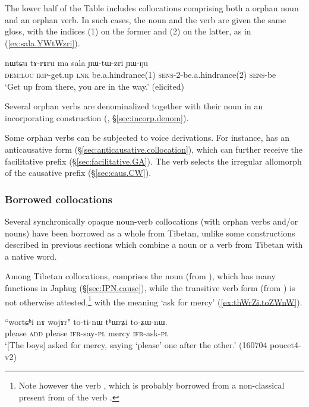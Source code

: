 The lower half of the Table includes collocations comprising both a orphan noun and an orphan verb. In such cases, the noun and the verb are given the same gloss, with the indices (1) on the former and (2) on the latter, as in (\ref{ex:sala.YWtWzri}). %

\begin{exe}
\ex \label{ex:sala.YWtWzri}
\gll nɯtɕu tɤ-rɤru ma sala ɲɯ-tɯ-zri ɲɯ-ŋu \\
\textsc{dem}:\textsc{loc} \textsc{imp}-get.up \textsc{lnk} be.a.hindrance(1) \textsc{sens}-2-be.a.hindrance(2) \textsc{sens}-be \\
\glt `Get up from there, you are in the way.' (elicited)
\end{exe}

Several orphan verbs are denominalized together with their noun in an incorporating construction (, §\ref{sec:incorp.denom}).

Some orphan verbs can be subjected to voice derivations. For instance,  has an anticausative form  (§\ref{sec:anticausative.collocation}), which can further receive the facilitative  prefix (§\ref{sec:facilitative.GA}). The verb  selects the irregular  allomorph of the causative prefix (§\ref{sec:caus.CW}).


\subsubsection{Borrowed collocations} \label{sec:borrowed.NV}
Several synchronically opaque noun-verb collocations (with orphan verbs and/or nouns) have been borrowed as a whole from Tibetan, unlike some constructions described in previous sections which combine a noun or a verb from Tibetan with a native word.

Among Tibetan collocations,  comprises the noun   (from ), which has many functions in Japhug (§\ref{sec:IPN.cause}), while the  transitive verb form  (from ) is not otherwise attested,\footnote{Note however the verb , which is probably borrowed from a non-classical present from  of the verb . } with the meaning `ask for mercy' (\ref{ex:thWrZi.toZWnW}).

\begin{exe}
\ex \label{ex:thWrZi.toZWnW}
\gll ``wortɕʰi nɤ wojɤr" to-ti-nɯ tʰɯrʑi to-ʑɯ-nɯ. \\
please \textsc{add} please \textsc{ifr}-say-\textsc{pl} mercy \textsc{ifr}-ask-\textsc{pl} \\
\glt `[The boys] asked for mercy, saying `please' one after the other.' (160704 poucet4-v2)
 \end{exe}  
 
